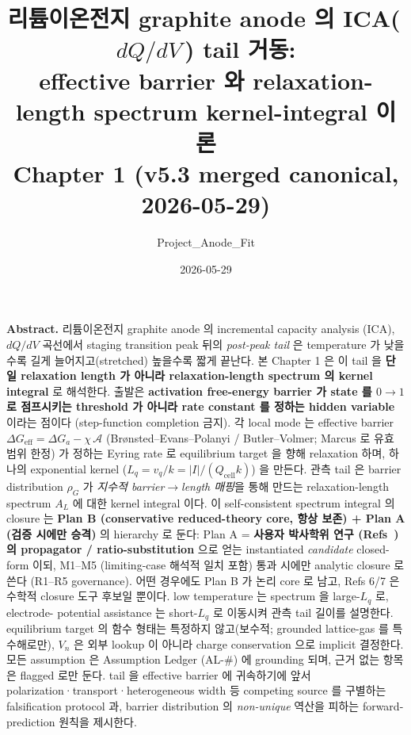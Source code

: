 \documentclass[11pt,a4paper]{article}
\title{\textbf{리튬이온전지 graphite anode 의 ICA(\,$dQ/dV$\,) tail 거동:\\
effective barrier 와 relaxation-length spectrum kernel-integral 이론}\\[0.4em]
\large Chapter 1 (v5.3 merged canonical, 2026-05-29)}
\author{Project\_Anode\_Fit}
\date{2026-05-29}
\newcommand{\eff}{\mathrm{eff}}
\newcommand{\cell}{\mathrm{cell}}
\begin{document}
\maketitle

\begin{center}\begin{minipage}{0.93\textwidth}
\small \textbf{Abstract.} 리튬이온전지 graphite anode 의 incremental capacity analysis
(ICA), $dQ/dV$ 곡선에서 staging transition peak 뒤의 \emph{post-peak tail} 은 temperature
가 낮을수록 길게 늘어지고(stretched) 높을수록 짧게 끝난다. 본 Chapter 1 은 이 tail 을
\textbf{단일 relaxation length 가 아니라 relaxation-length spectrum 의 kernel integral}
로 해석한다. 출발은 \textbf{activation free-energy barrier 가 state 를 $0\!\to\!1$ 로
점프시키는 threshold 가 아니라 rate constant 를 정하는 hidden variable} 이라는 점이다
(step-function completion 금지). 각 local mode 는 effective barrier $\Delta G_\eff =
\Delta G_a - \chi\,\mathcal A$ (Brønsted--Evans--Polanyi / Butler--Volmer; Marcus 로 유효
범위 한정) 가 정하는 Eyring rate 로 equilibrium target 을 향해 relaxation 하며, 하나의
exponential kernel ($L_q=v_q/k=|I|/(Q_\cell k)$) 을 만든다. 관측 tail 은 barrier distribution $\rho_G$ 가
\emph{지수적 barrier$\to$length 매핑}을 통해 만드는 relaxation-length spectrum $A_L$ 에
대한 kernel integral 이다. 이 self-consistent spectrum integral 의 closure 는 \textbf{Plan B
(conservative reduced-theory core, 항상 보존) + Plan A (검증 시에만 승격)} 의 hierarchy 로
둔다: Plan A = \textbf{사용자 박사학위 연구 (Refs~\cite{lee2011,son2013}) 의 propagator /
ratio-substitution} 으로 얻는 instantiated \emph{candidate} closed-form 이되, M1--M5
(limiting-case 해석적 일치 포함) 통과 시에만 analytic closure 로 쓴다 (R1--R5 governance).
어떤 경우에도 Plan B 가 논리 core 로 남고, Refs 6/7 은 수학적 closure 도구 후보일 뿐이다. low temperature 는 spectrum 을 large-$L_q$ 로, electrode-
potential assistance 는 short-$L_q$ 로 이동시켜 관측 tail 길이를 설명한다. equilibrium
target 의 함수 형태는 특정하지 않고(보수적; grounded lattice-gas 를 특수해로만), $V_n$ 은
외부 lookup 이 아니라 charge conservation 으로 implicit 결정한다. 모든 assumption 은
Assumption Ledger (AL-\#) 에 grounding 되며, 근거 없는 항목은 flagged 로만 둔다. tail 을
effective barrier 에 귀속하기에 앞서 polarization·transport·heterogeneous width 등 competing
source 를 구별하는 falsification protocol 과, barrier distribution 의 \emph{non-unique}
역산을 피하는 forward-prediction 원칙을 제시한다.
\end{minipage}\end{center}
\end{document}
